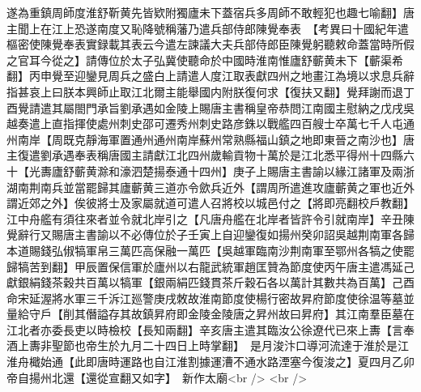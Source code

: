 遂為重鎮周師度淮舒靳黄先皆欵附獨廬未下蓋宿兵多周師不敢輕犯也趣七喻翻】唐主聞上在江上恐遂南度又恥降號稱藩乃遣兵部侍郎陳覺奉表　【考異曰十國紀年遣樞密使陳覺奉表實録載其表云今遣左諫議大夫兵部侍郎臣陳覺躬聽敕命蓋當時所假之官耳今從之】請傳位於太子弘冀使聽命於中國時淮南惟廬舒蘄黄未下【蘄渠希翻】丙申覺至迎鑾見周兵之盛白上請遣人度江取表獻四州之地畫江為境以求息兵辭指甚哀上曰朕本興師止取江北爾主能舉國内附朕復何求【復扶又翻】覺拜謝而退丁酉覺請遣其屬閤門承旨劉承遇如金陵上賜唐主書稱皇帝恭問江南國主慰納之戊戌吳越奏遣上直指揮使處州刺史邵可遷秀州刺史路彦銖以戰艦四百艘士卒萬七千人屯通州南岸【周既克靜海軍置通州通州南岸蘇州常熟縣福山鎮之地即東晉之南沙也】唐主復遣劉承遇奉表稱唐國主請獻江北四州歲輸貢物十萬於是江北悉平得州十四縣六十【光夀廬舒蘄黄滁和濠泗楚揚泰通十四州】庚子上賜唐主書諭以緣江諸軍及兩浙湖南荆南兵並當罷歸其廬蘄黄三道亦令歛兵近外【謂周所遣進攻廬蘄黄之軍也近外謂近郊之外】俟彼將士及家屬就道可遣人召將校以城邑付之【將即亮翻校戶教翻】江中舟艦有須往來者並令就北岸引之【凡唐舟艦在北岸者皆許令引就南岸】辛丑陳覺辭行又賜唐主書諭以不必傳位於子壬寅上自迎鑾復如揚州癸卯詔吳越荆南軍各歸本道賜錢弘俶犒軍帛三萬匹高保融一萬匹【吳越軍臨南沙荆南軍至鄂州各犒之使罷歸犒苦到翻】甲辰置保信軍於廬州以右龍武統軍趙匡贊為節度使丙午唐主遣馮延己獻銀絹錢茶穀共百萬以犒軍【銀兩絹匹錢貫茶斤穀石各以萬計其數共為百萬】己酉命宋延渥將水軍三千泝江廵警庚戌敇故淮南節度使楊行密故昇府節度使徐温等墓並量給守戶【削其僭謚存其故鎮昇府即金陵金陵唐之昇州故曰昇府】其江南羣臣墓在江北者亦委長吏以時檢校【長知兩翻】辛亥唐主遣其臨汝公徐遼代已來上夀【言奉酒上夀非聖節也帝生於九月二十四日上時掌翻】　是月浚汴口導河流達于淮於是江淮舟檝始通【此即唐時運路也自江淮割據運漕不通水路湮塞今復浚之】夏四月乙卯帝自揚州北還【還從宣翻又如字】　新作太廟<br />
<br />
